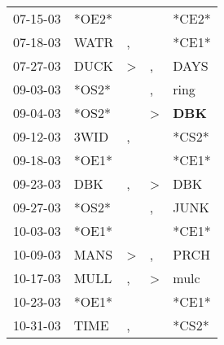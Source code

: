 \begin{supertabular}{p{0.07\textwidth}p{0.06\textwidth}p{0.02\textwidth}p{0.02\textwidth}p{0.06\textwidth}}
          07-15-03\textsuperscript{} &                            *OE2* &                  &                  &                            *CE2* \\
          07-18-03\textsuperscript{} &           WATR\textsuperscript{} &                , &                  &                            *CE1* \\
          07-27-03\textsuperscript{} &           DUCK\textsuperscript{} &     \textgreater &                , &           DAYS\textsuperscript{} \\
          09-03-03\textsuperscript{} &                            *OS2* &                  &                , &           ring\textsuperscript{} \\
          09-04-03\textsuperscript{} &                            *OS2* &                  &     \textgreater &   \textbf{DBK\textsuperscript{}} \\
          09-12-03\textsuperscript{} &           3WID\textsuperscript{} &                , &                  &                            *CS2* \\
          09-18-03\textsuperscript{} &                            *OE1* &                  &                  &                            *CE1* \\
          09-23-03\textsuperscript{} &            DBK\textsuperscript{} &                , &     \textgreater &            DBK\textsuperscript{} \\
          09-27-03\textsuperscript{} &                            *OS2* &                  &                , &           JUNK\textsuperscript{} \\
          10-03-03\textsuperscript{} &                            *OE1* &                  &                  &                            *CE1* \\
          10-09-03\textsuperscript{} &           MANS\textsuperscript{} &     \textgreater &                , &           PRCH\textsuperscript{} \\
          10-17-03\textsuperscript{} &           MULL\textsuperscript{} &                , &     \textgreater &           mulc\textsuperscript{} \\
          10-23-03\textsuperscript{} &                            *OE1* &                  &                  &                            *CE1* \\
          10-31-03\textsuperscript{} &           TIME\textsuperscript{} &                , &                  &                            *CS2* \\

\end{supertabular}
